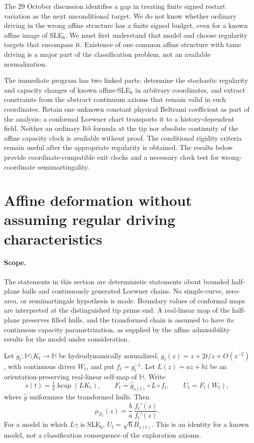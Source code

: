 \documentclass[11pt]{article}
\theoremstyle{definition}\newtheorem{definition}[theorem]{Definition}
\theoremstyle{remark}\newtheorem{remark}[theorem]{Remark}
\begin{document}
The 29 October discussion identifies a gap in treating finite signed
restart variation as the next unconditional target. We do not know
whether ordinary driving in the wrong affine structure has a finite
signed budget, even for a known affine image of SLE$_6$. We must first
understand that model and choose regularity targets that encompass it.
Existence of one common affine structure with tame driving is a major
part of the classification problem, not an available normalization.

The immediate program has two linked parts: determine the stochastic
regularity and capacity changes of known affine-SLE$_6$ in arbitrary
coordinates, and extract constraints from the abstract continuum axioms
that remain valid in such coordinates. Retain one unknown constant
physical Beltrami coefficient as part of the analysis; a conformal
Loewner chart transports it to a history-dependent field. Neither an
ordinary It\^o formula at the tip nor absolute continuity of the affine
capacity clock is available without proof. The conditional rigidity
criteria remain useful after the appropriate regularity is obtained.
The results below provide coordinate-compatible exit clocks and a
necessary clock test for wrong-coordinate semimartingality.

\section{Affine deformation without assuming regular driving characteristics}
\label{sec:affine-beltrami-prefix}

\paragraph{Scope.}
The statements in this section are deterministic statements about bounded
half-plane hulls and continuously generated Loewner chains. No simple-curve,
zero-area, or semimartingale hypothesis is made. Boundary values of conformal
maps are interpreted at the distinguished tip prime end. A real-linear map
of the half-plane preserves filled hulls, and the transformed chain is
assumed to have its continuous capacity parametrization, as supplied by the
affine admissibility results for the model under consideration.

Let $g_t:\mathbb H\setminus K_t\to\mathbb H$ be hydrodynamically
normalized, $g_t(z)=z+2t/z+O(z^{-2})$, with continuous driver $W_t$, and put
$f_t=g_t^{-1}$. Let $L(z)=az+b\bar z$ be an orientation-preserving
real-linear self-map of $\mathbb H$. Write
\[
 s(t)=\tfrac12\operatorname{hcap}(LK_t),\qquad
 F_t=\widehat g_{s(t)}\circ L\circ f_t,\qquad
 U_t=F_t(W_t),
 \tag{AB1}
\]
where $\widehat g$ uniformizes the transformed hulls. Then
\[
 \mu_{F_t}(z)=\frac ba\,
       \frac{\overline{f_t'(z)}}{f_t'(z)}.
 \tag{AB2}
\]
For a model in which $L\gamma$ is SLE$_6$, $U_t=\sqrt6B_{s(t)}$.
This is an identity for a known model, not a classification consequence
of the exploration axioms.
\end{document}
